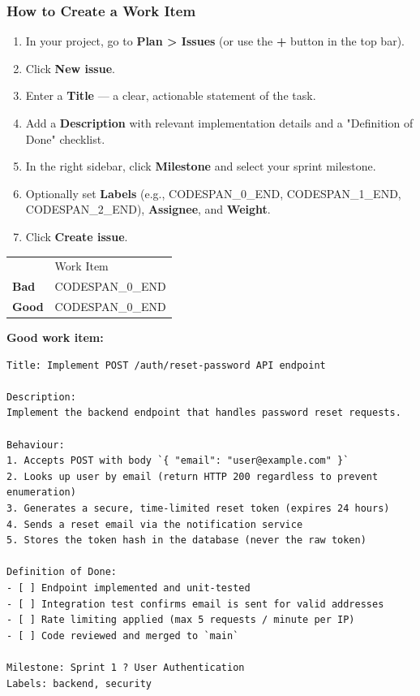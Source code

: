 \documentclass[11pt,a4paper]{book}
\begin{document}
\subsubsection{How to Create a Work Item}

\begin{enumerate}
  \item In your project, go to \textbf{Plan > Issues} (or use the \textbf{+} button in the top bar).
  \item Click \textbf{New issue}.
  \item Enter a \textbf{Title} --- a clear, actionable statement of the task.
  \item Add a \textbf{Description} with relevant implementation details and a "Definition of Done" checklist.
  \item In the right sidebar, click \textbf{Milestone} and select your sprint milestone.
  \item Optionally set \textbf{Labels} (e.g., CODESPAN\_0\_END, CODESPAN\_1\_END, CODESPAN\_2\_END), \textbf{Assignee}, and \textbf{Weight}.
  \item Click \textbf{Create issue}.
\end{enumerate}

\begin{tabular}{ll}
\hline
 & Work Item \\
\textbf{Bad} & CODESPAN\_0\_END \\
\textbf{Good} & CODESPAN\_0\_END \\
\hline
\end{tabular}

\textbf{Good work item:}

\begin{lstlisting}
Title: Implement POST /auth/reset-password API endpoint

Description:
Implement the backend endpoint that handles password reset requests.

Behaviour:
1. Accepts POST with body `{ "email": "user@example.com" }`
2. Looks up user by email (return HTTP 200 regardless to prevent enumeration)
3. Generates a secure, time-limited reset token (expires 24 hours)
4. Sends a reset email via the notification service
5. Stores the token hash in the database (never the raw token)

Definition of Done:
- [ ] Endpoint implemented and unit-tested
- [ ] Integration test confirms email is sent for valid addresses
- [ ] Rate limiting applied (max 5 requests / minute per IP)
- [ ] Code reviewed and merged to `main`

Milestone: Sprint 1 ? User Authentication
Labels: backend, security
\end{lstlisting}
\end{document}
